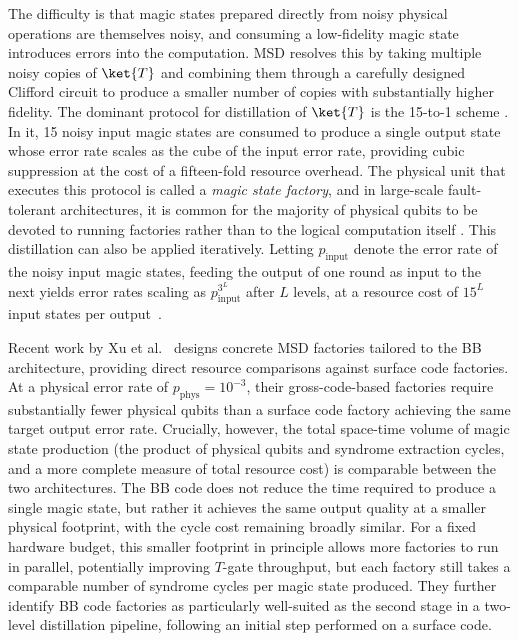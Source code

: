 The difficulty is that magic states prepared directly from noisy physical operations are themselves noisy, and consuming a low-fidelity magic state introduces errors into the computation. MSD resolves this by taking multiple noisy copies of $\ket{T}$ and combining them through a carefully designed Clifford circuit to produce a smaller number of copies with substantially higher fidelity. The dominant protocol for distillation of $\ket{T}$ is the 15-to-1 scheme \cite{Bravyi_2005}. In it, 15 noisy input magic states are consumed to produce a single output state whose error rate scales as the cube of the input error rate, providing cubic suppression at the cost of a fifteen-fold resource overhead. The physical unit that executes this protocol is called a \emph{magic state factory}, and in large-scale fault-tolerant architectures, it is common for the majority of physical qubits to be devoted to running factories rather than to the logical computation itself \cite{Xu_2026}. This distillation can also be applied iteratively. Letting $p_{\text{input}}$ denote the error rate of the noisy input magic states, feeding the output of one round as input to the next yields error rates scaling as $p_{\text{input}}^{3^L}$ after $L$ levels, at a resource cost of $15^L$ input states per output~\cite{Bravyi_2005}.

Recent work by Xu et al.\ \cite{Xu_2026} designs concrete MSD factories tailored to the BB architecture, providing direct resource comparisons against surface code factories. At a physical error rate of $p_{\text{phys}} = 10^{-3}$, their gross-code-based factories require substantially fewer physical qubits than a surface code factory achieving the same target output error rate. Crucially, however, the total space-time volume of magic state production (the product of physical qubits and syndrome extraction cycles, and a more complete measure of total resource cost) is comparable between the two architectures. The BB code does not reduce the time required to produce a single magic state, but rather it achieves the same output quality at a smaller physical footprint, with the cycle cost remaining broadly similar. For a fixed hardware budget, this smaller footprint in principle allows more factories to run in parallel, potentially improving $T$-gate throughput, but each factory still takes a comparable number of syndrome cycles per magic state produced. They further identify BB code factories as particularly well-suited as the second stage in a two-level distillation pipeline, following an initial step performed on a surface code.

